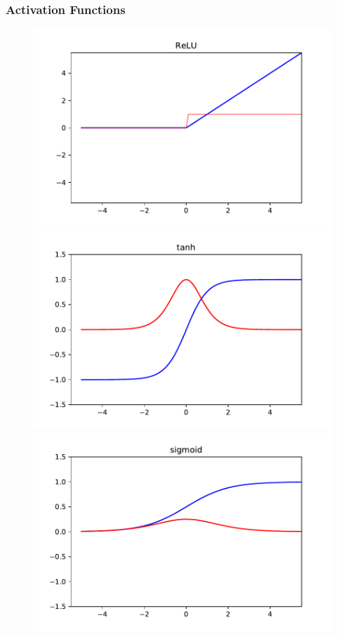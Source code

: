 \documentclass{beamer}
\begin{document}
\begin{frame}
\frametitle{Activation Functions}
\begin{figure}[t]
	
	\centering
	\begin{minipage}{0.3\linewidth}
		\includegraphics[scale=0.27]{relu.pdf}
	\end{minipage}
	\begin{minipage}{0.3\linewidth}
		\includegraphics[scale=0.27]{tanh.pdf}
	\end{minipage}
	\begin{minipage}{0.3\linewidth}
		\includegraphics[scale=0.27]{sigmoid.pdf}

\end{minipage}
\end{figure}
\end{frame}
\end{document}

